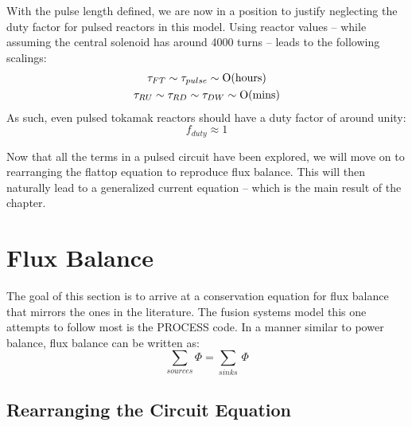 With the pulse length defined, we are now in a position to justify neglecting the duty factor for pulsed reactors in this model. Using  reactor values -- while assuming the central solenoid has around 4000 turns -- leads to the following scalings:
\begin{gather}
	\tau_{FT} \sim \tau_{pulse} \sim \textnormal{O(hours)} \\
	\tau_{RU} \sim \tau_{RD} \sim \tau_{DW} \sim \textnormal{O(mins)}
\end{gather}
As such, even pulsed tokamak reactors should have a duty factor of around unity:
\begin{equation}
	f_{duty} \approx 1
\end{equation}

Now that all the terms in a pulsed circuit have been explored, we will move on to rearranging the flattop equation to reproduce flux balance. This will then naturally lead to a generalized current equation -- which is the main result of the chapter.

\section{ Flux Balance}

The goal of this section is to arrive at a conservation equation for flux balance that mirrors the ones in the literature. The fusion systems model this one attempts to follow most is the PROCESS code.\cite{process} In a manner similar to power balance, flux balance can be written as:
\begin{equation}
	\sum_{sources} \Phi = \sum_{sinks} \, \Phi
\end{equation}

\subsection{Rearranging the Circuit Equation}

